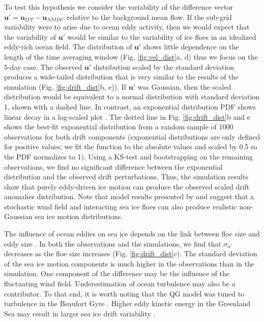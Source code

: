 \documentclass[aog]{igs}
\begin{document}
To test this hypothesis we consider the variability of the difference vector $\mathbf{u}' = \mathbf{u}_{IFT} - \mathbf{u}_{NSIDC}$ relative to the background mean flow.  If the sub-grid variability were to arise due to ocean eddy activity, then we would expect that the variability of $\mathbf{u}'$ would be similar to the variability of ice floes in an idealized eddy-rich ocean field. The distribution of $\mathbf{u}'$ shows little dependence on the length of the time averaging window (Fig. \ref{fig:vel_dist}a, d) thus we focus on the 5-day case. The observed $\mathbf{u}'$ distribution scaled by the standard deviation produces a wide-tailed distribution that is very similar to the results of the simulation (Fig. \ref{fig:drift_dist}b, e)). If $\mathbf{u}'$ was Gaussian, then the scaled distribution would be equivalent to a normal distribution with standard deviation 1, shown with a dashed line. In contrast, an exponential distribution PDF shows linear decay in a log-scaled plot \citep{bracco2000_VelocityProbability, rampal2009_turbulentFluctuations}. The dotted line in Fig. \ref{fig:drift_dist}b and e shows the best-fit exponential distribution from a random sample of 1000 observations for both drift components (exponential distributions are only defined for positive values; we fit the function to the absolute values and scaled by 0.5 so the PDF normalizes to 1). Using a KS-test and bootstrapping on the remaining observations, we find no significant difference between the exponential distribution and the observed drift perturbations. Thus, the simulation results show that purely eddy-driven ice motion can produce the observed scaled drift anomalies distribution. Note that model results presented by \cite{rallabandi2023_TransportSea} and \cite{shaddy2025_WinddrivenCollisions} suggest that a stochastic wind field and interacting sea ice floes can also produce realistic non-Gaussian sea ice motion distributions.

The influence of ocean eddies on sea ice depends on the link between floe size and eddy size \citep{brenner2023_ScaleDependentAirSea, kim2024_CharacterizationSea}.
In both the observations and the simulations, we find that $\sigma_{u'}$ decreases as the floe size increases (Fig. \ref{fig:drift_dist}c). 
The standard deviation of the sea ice motion components is much higher in the observations than in the simulation.
One component of the difference may be the influence of the fluctuating wind field.
Underestimation of ocean turbulence may also be a contributor.
To that end, it is worth noting that the QG model was tuned to turbulence in the Beaufort Gyre \citep{manucharyan2022_SpinningIce}.
Higher eddy kinetic energy in the Greenland Sea may result in larger sea ice drift variability \citep{wangEddyKineticEnergy2020}.
\end{document}
